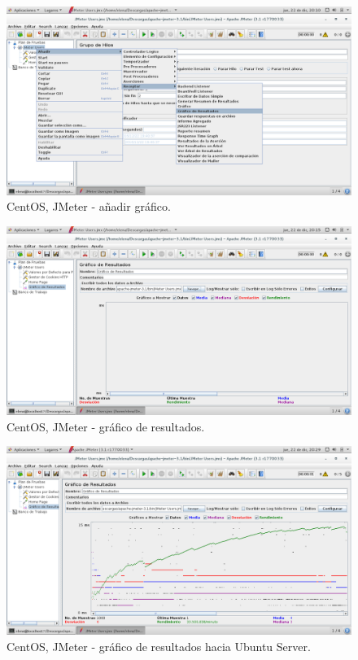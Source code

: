 \begin{figure}[H] 
	\centering
	\includegraphics[width=14.7cm]{./img/ejercicio4_9.png} 	
	\caption{CentOS, JMeter - añadir gráfico.} \label{fig:ejercicio4_9}
\end{figure}

\begin{figure}[H] 
	\centering
	\includegraphics[width=14.7cm]{./img/ejercicio4_10.png} 	
	\caption{CentOS, JMeter - gráfico de resultados.} \label{fig:ejercicio4_10}
\end{figure}

\begin{figure}[H] 
	\centering
	\includegraphics[width=14.7cm]{./img/ejercicio4_11.png} 	
	\caption{CentOS, JMeter - gráfico de resultados hacia Ubuntu Server.} \label{fig:ejercicio4_11}
\end{figure}


